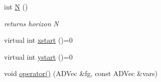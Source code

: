 \begin{DoxyCompactItemize}
\mbox{\label{classModel_aca776f8a10906afa8a5c362034727921}} 
int \mbox{\hyperlink{classModel_aca776f8a10906afa8a5c362034727921}{N}} ()
\begin{DoxyCompactList}\small\item\em returns horizon N \end{DoxyCompactList}\item 
virtual int \mbox{\hyperlink{classModel_ab98f8c18036d9bada533325300865c5e}{xstart}} ()=0
\item 
virtual int \mbox{\hyperlink{classModel_ae505a277c05e465d0a41fa75d4116350}{ystart}} ()=0
\item 
void \mbox{\hyperlink{classModel_a138487dfb01ab6af0856c493f20ad179}{operator()}} (A\+D\+Vec \&fg, const A\+D\+Vec \&vars)
\end{DoxyCompactItemize}
